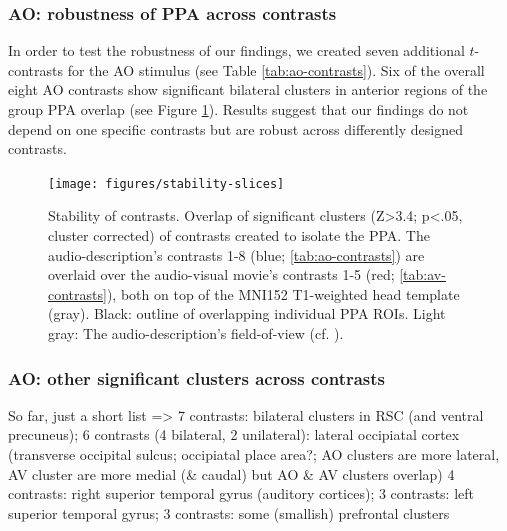 \documentclass[english]{article}
\begin{document}
\subsubsection{AO: robustness of PPA across contrasts}


In order to test the robustness of our findings, we created seven additional
$t$-contrasts for the AO stimulus (see Table \ref{tab:ao-contrasts}).
Six of the overall eight AO contrasts show significant bilateral clusters in
anterior regions of the group PPA overlap (see Figure
\ref{fig:stability-slices}).
Results suggest that our findings do not depend on one specific contrasts but
are robust across differently designed contrasts.
%

\begin{figure} \centering
    \texttt{[image: figures/stability-slices]}
    \caption{Stability of contrasts. Overlap of significant clusters (Z>3.4;
        p<.05, cluster corrected) of contrasts created to isolate the PPA.
        The audio-description's contrasts 1-8 (blue; \ref{tab:ao-contrasts})
        are overlaid over the audio-visual movie's contrasts 1-5 (red;
        \ref{tab:av-contrasts}), both on top of the MNI152 T1-weighted head
        template (gray).
        Black: outline of overlapping individual PPA ROIs.
        Light gray: The audio-description's field-of-view (cf.
        \citep{hanke2014audiomovie}).}
    \label{fig:stability-slices}
    \end{figure}


\subsubsection{AO: other significant clusters across contrasts}
So far, just a short list => 7 contrasts: bilateral clusters in RSC (and ventral
precuneus);
6 contrasts (4 bilateral, 2 unilateral): lateral occipiatal cortex (transverse
occipital sulcus; occipiatal place area?; AO clusters are more lateral, AV
cluster are more medial (\& caudal) but AO \& AV clusters overlap)
4 contrasts: right superior temporal gyrus (auditory cortices); 3 contrasts:
left superior temporal gyrus; 3 contrasts: some (smallish) prefrontal clusters
\end{document}
